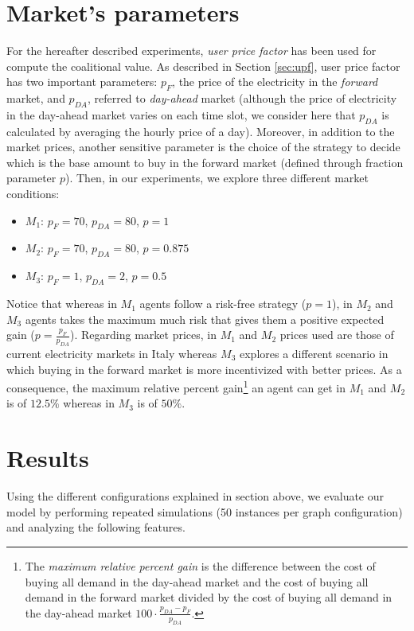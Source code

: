 \documentclass[11pt, twoside, titlepage, a4paper, openright]{report}
\begin{document}
\section{Market's parameters}
\label{sec:market_parameters}
For the hereafter described experiments, \textit{user price factor} has been used for compute the coalitional value. As described in Section \ref{sec:upf}, user price factor has two important parameters: $p_{F}$, the price of the electricity in the \textit{forward} market, and $p_{DA}$, referred to \textit{day-ahead} market (although the price of electricity in the
day-ahead market varies on each time slot, we consider here that $p_{DA}$ is
calculated by averaging the hourly price of a day).
Moreover, in addition to the market prices, another sensitive parameter is the choice of the strategy to decide which is the
base amount to buy in the forward market (defined through fraction parameter
$p$).
Then, in our experiments, we explore three different market conditions:
\begin{itemize}
  \item $M_1$: $p_F=70$, $p_{DA}=80$, $p=1$
  \item $M_2$: $p_F=70$, $p_{DA}=80$, $p=0.875$
  \item $M_3$: $p_F=1$, $p_{DA}=2$, $p=0.5$
\end{itemize}

\noindent Notice that whereas in $M_1$ agents follow a risk-free strategy ($p=1$), in $M_2$ and
$M_3$ agents takes the maximum much risk that gives them a positive expected gain
($p=\frac{p_F}{p_{DA}}$). Regarding market prices, in $M_1$ and $M_2$ prices used
are those of current electricity markets in Italy \cite{GME} whereas $M_3$ explores a
different scenario in which buying in the forward market is more incentivized
with better prices. As a consequence, the maximum relative
percent gain\footnote{The \textit{maximum relative percent gain} is the
difference between the cost of buying all demand in the day-ahead market and the cost of buying all demand in the
forward market divided by the cost of buying all demand in the day-ahead
market $100\cdot\frac{p_{DA}-p_{F}}{p_{DA}}$.} an agent can get in $M_1$ and $M_2$
is of $12.5\%$ whereas in $M_3$ is of $50\%$.
 
\section{Results}\label{sec:results}
Using the different configurations explained in section above, we evaluate our
model by performing repeated simulations (50 instances per graph configuration)
and analyzing the following features.
\end{document}
